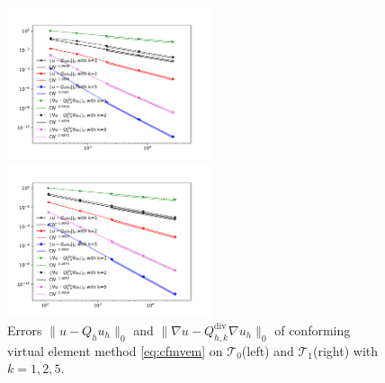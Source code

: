 \documentclass[10pt]{amsart}
\renewcommand{\div}{\operatorname{div}}
\numberwithin{equation}{section}
\begin{document}
\begin{figure}[htbp]
\centering
\begin{minipage}[t]{0.49\linewidth}
\centering
\includegraphics[width=6cm]{./figures/cvem_convex.pdf}
\end{minipage}%
\begin{minipage}[t]{0.49\linewidth}
\centering
\includegraphics[width=6cm]{./figures/cvem_nonconvex.pdf}
\end{minipage}%
\centering
\caption{Errors $\|u - Q_h u_h\|_0$ and $\|\nabla u - Q_{h, k}^{\div}\nabla u_h\|_0$ 
of conforming virtual element method \eqref{eq:cfmvem} on $\mathcal T_0$(left) and 
$\mathcal T_1$(right) with $k=1, 2, 5$.}
\label{fig:rate2}
\end{figure}




\end{document}
